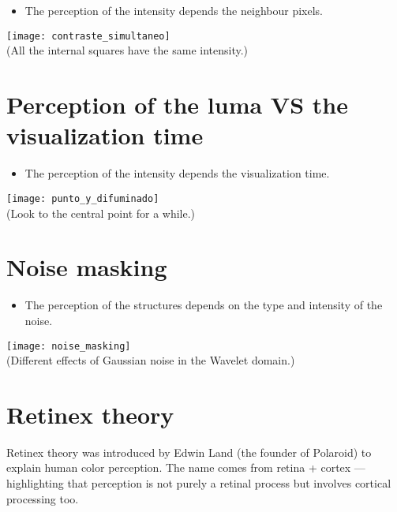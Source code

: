 \section*{}
\begin{itemize}
\item The perception of the intensity depends the neighbour pixels.
\end{itemize}
\begin{center}
  \texttt{[image: contraste\_simultaneo]}\\
  (All the internal squares have the same intensity.)
\end{center}

\section{Perception of the luma VS the visualization time}
\begin{itemize}
\item The perception of the intensity depends the visualization time.
\end{itemize}
\begin{center}
  \texttt{[image: punto\_y\_difuminado]}\\
  (Look to the central point for a while.)
\end{center}

\section{Noise masking}
\begin{itemize}
\item The perception of the structures depends on the type and intensity of the noise.
\end{itemize}
\begin{center}
  \texttt{[image: noise\_masking]}\\
  (Different effects of Gaussian noise in the Wavelet domain.)
\end{center}

\section{Retinex theory}

Retinex theory was introduced by Edwin Land (the founder of Polaroid)
to explain human color perception. The name comes from retina + cortex
— highlighting that perception is not purely a retinal process but
involves cortical processing too.
